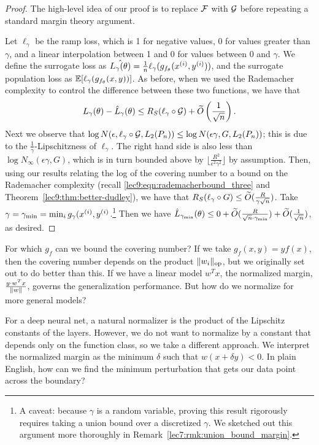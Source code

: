 \begin{proof}
The high-level idea of our proof is to replace $\cF$ with $\cG$ before repeating a standard margin theory argument.

Let $\ell_\gamma$ be the ramp loss, which is 1 for negative values, 0 for values greater than $\gamma$, and a linear interpolation between 1 and 0 for values between 0 and $\gamma$. We define the surrogate loss as $\hat{L_\gamma(\theta)} = \frac{1}{n} \ell_\gamma(g_{f_\theta}(x\sp{i}, y\sp{i}))$, and the surrogate population loss as $\Exp[\ell_\gamma(g_{f_\theta}(x, y))]$. As before, when we used the Rademacher complexity to control the difference between these two functions, we have that
\begin{equation}
L_\gamma(\theta) - \hat{L}_\gamma(\theta) \leq R_S(\ell_\gamma \circ \cG) + \tilO\l (\frac{1}{\sqrt{n}}\r ).
\end{equation}
Next we observe that $\log N(\epsilon, \ell_\gamma \circ \cG, L_2(P_n)) \leq \log N(\epsilon\gamma, G, L_2(P_n))$; this is due to the $\frac{1}{\gamma}$-Lipschitzness of $\ell_\gamma$. The right hand side is also less than $\log N_\infty(\epsilon\gamma, G)$, which is in turn bounded above by $\lfloor \frac{R^2}{\epsilon^2 \gamma^2} \rfloor$ by assumption.
Then, using our results relating the log of the covering number to a bound on the Rademacher complexity (recall \ref{lec9:eqn:rademacherbound_three} and Theorem~\ref{lec9:thm:better-dudley}), we have that $R_S(\ell_\gamma \circ G) \leq \tilO(\frac{R}{\gamma \sqrt{n}})$.
Take $\gamma = \gamma_{\min} = \min_{i} g_\gamma(x\sp{i}, y\sp{i}$.\footnote{A caveat: because $\gamma$ is a random variable, proving this result rigorously requires taking a union bound over a discretized $\gamma$. We sketched out this argument more thoroughly in Remark~\ref{lec7:rmk:union_bound_margin}.} Then we have $\hat{L}_{\gamma_\text{min}} (\theta) \leq 0 + \tilO(\frac{R}{\sqrt{n} \cdot \gamma_\text{min}}) + \tilO(\frac{1}{\sqrt{n}})$, as desired.
\end{proof}
For which $g_f$ can we bound the covering number? If we take $g_f(x, y) = yf(x)$, then the covering number depends on the product $\norm{w_i}_{\text{op}}$, but we originally set out to do better than this. If we have a linear model $w^T x$, the normalized margin, $\frac{y \cdot w^T x}{\norm{w}}$, governs the generalization performance. But how do we normalize for more general models? 

For a deep neural net, a natural normalizer is the product of the Lipschitz constants of the layers. However, we do not want to normalize by a constant that depends only on the function class, so we take a different approach. We interpret the normalized margin as the minimum $\delta$ such that $w(x + \delta y) < 0$. In plain English, how can we find the minimum perturbation that gets our data point across the boundary?


